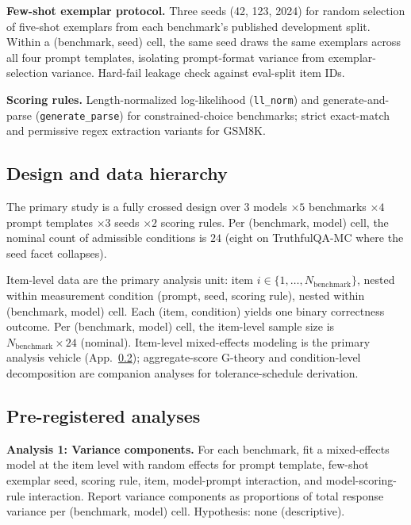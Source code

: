 \documentclass[11pt]{article}
\begin{document}
\textbf{Few-shot exemplar protocol.} Three seeds (42, 123, 2024) for random selection of five-shot exemplars from each benchmark's published development split. Within a (benchmark, seed) cell, the same seed draws the same exemplars across all four prompt templates, isolating prompt-format variance from exemplar-selection variance. Hard-fail leakage check against eval-split item IDs.

\textbf{Scoring rules.} Length-normalized log-likelihood (\texttt{ll\_norm}) and generate-and-parse (\texttt{generate\_parse}) for constrained-choice benchmarks; strict exact-match and permissive regex extraction variants for GSM8K.

\subsection{Design and data hierarchy}
\label{app:prereg-design}

The primary study is a fully crossed design over $3$ models $\times 5$ benchmarks $\times 4$ prompt templates $\times 3$ seeds $\times 2$ scoring rules. Per (benchmark, model) cell, the nominal count of admissible conditions is $24$ (eight on TruthfulQA-MC where the seed facet collapses).

Item-level data are the primary analysis unit: item $i \in \{1, \ldots, N_{\mathrm{benchmark}}\}$, nested within measurement condition (prompt, seed, scoring rule), nested within (benchmark, model) cell. Each (item, condition) yields one binary correctness outcome. Per (benchmark, model) cell, the item-level sample size is $N_{\mathrm{benchmark}} \times 24$ (nominal). Item-level mixed-effects modeling is the primary analysis vehicle (App.~\ref{app:prereg-analyses}); aggregate-score G-theory and condition-level decomposition are companion analyses for tolerance-schedule derivation.

\subsection{Pre-registered analyses}
\label{app:prereg-analyses}

\textbf{Analysis 1: Variance components.} For each benchmark, fit a mixed-effects model at the item level with random effects for prompt template, few-shot exemplar seed, scoring rule, item, model-prompt interaction, and model-scoring-rule interaction. Report variance components as proportions of total response variance per (benchmark, model) cell. Hypothesis: none (descriptive).
\end{document}
